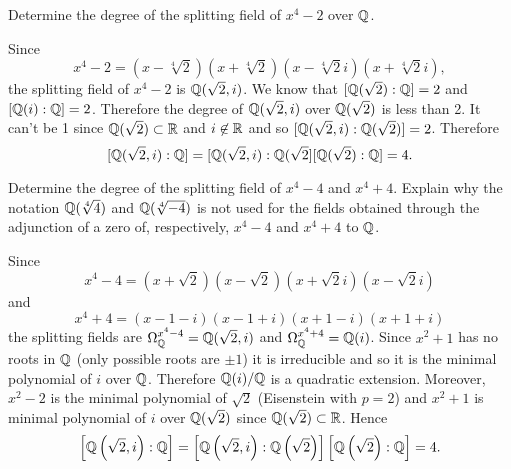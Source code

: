     \begin{ex}{21.37}
        Determine the degree of the splitting field of $x^4-2$ over $\mathbb{Q}$.
    \end{ex}
    \begin{sol}
        Since
        $$x^4-2=(x-\sqrt[4]{2})(x+\sqrt[4]{2})(x-\sqrt[4]{2}i)(x+\sqrt[4]{2}i),$$
        the splitting field of $x^4-2$ is $\mathbb{Q}(\sqrt{2}, i)$.
        We know that $[\mathbb{Q}(\sqrt{2}):\mathbb{Q}]=2$ and $[\mathbb{Q}(i):\mathbb{Q}]=2$. Therefore the degree of $\mathbb{Q}(\sqrt{2},i)$ over $\mathbb{Q}(\sqrt{2})$ is less than 2.
        It can't be 1 since $\mathbb{Q}(\sqrt{2})\subset\mathbb{R}$ and $i\not\in\mathbb{R}$ and so $[\mathbb{Q}(\sqrt{2},i):\mathbb{Q}(\sqrt{2})]=2$. Therefore
        $$[\mathbb{Q}(\sqrt{2},i):\mathbb{Q}]=[\mathbb{Q}(\sqrt{2},i):\mathbb{Q}(\sqrt{2}][\mathbb{Q}(\sqrt{2}):\mathbb{Q}]=4.$$ 
    \end{sol}
    
    \begin{ex}{21.38}
        Determine the degree of the splitting field of $x^4-4$ and $x^4+4$. Explain why the notation $\mathbb{Q}(\sqrt[4]{4})$ and $\mathbb{Q}(\sqrt[4]{-4})$  is not used for the fields obtained through the adjunction of a zero of, respectively, $x^4-4$ and $x^4+4$ to $\mathbb{Q}$.
    \end{ex}
    \begin{sol}
        Since
        $$ x^4-4=\left(x+\sqrt{2}\right)\left(x-\sqrt{2}\right)\left(x+\sqrt{2}i\right)\left(x-\sqrt{2}i\right)$$
        and
        $$x^4+4=\left(x-1-i\right)\left(x-1+i\right)\left(x+1-i\right)\left(x+1+i\right)$$
        the splitting fields are $\Omega_{\mathbb{Q}}^{x^4-4}=\mathbb{Q}(\sqrt{2}, i)$ and $\Omega_{\mathbb{Q}}^{x^4+4}=\mathbb{Q}(i)$.
        Since $x^2+1$ has no roots in $\mathbb{Q}$ (only possible roots are $\pm 1$) it is irreducible and so it is the minimal polynomial of $i$ over $\mathbb{Q}$.
        Therefore $\mathbb{Q}(i)/\mathbb{Q}$ is a quadratic extension. 
        Moreover, $x^2-2$ is the minimal polynomial of $\sqrt{2}$ (Eisenstein with $p=2$) and $x^2+1$ is minimal polynomial of $i$ over $\mathbb{Q}(\sqrt{2})$ since $\mathbb{Q}(\sqrt{2})\subset\mathbb{R}$.
        Hence
        $$\left[\mathbb{Q}\left(\sqrt{2}, i\right):\mathbb{Q}\right]=\left[\mathbb{Q}\left(\sqrt{2}, i\right):\mathbb{Q}\left(\sqrt{2}\right)\right]\left[\mathbb{Q}\left(\sqrt{2}\right):\mathbb{Q}\right]=4.$$   
    \end{sol}